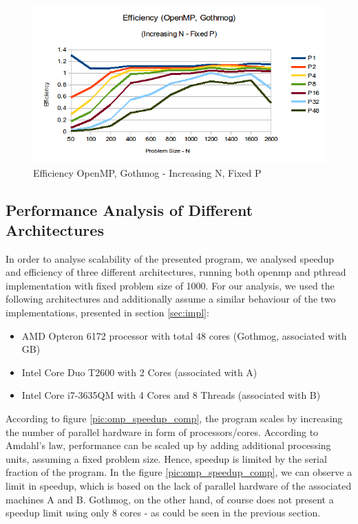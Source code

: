 \documentclass[conference]{IEEEtran}
\begin{document}
\begin{figure}[h]
  \centering
  \includegraphics[scale=0.42]{pic/omp_gothmog_efficiency-fixed-p.png} 
  \caption{Efficiency OpenMP, Gothmog - Increasing N, Fixed P}
  \label{pic:omp_eff_fixed-p}
\end{figure}

\subsection{Performance Analysis of Different Architectures}
\label{sec:analysis:openmp}

In order to analyse scalability of the presented program, we analysed speedup and efficiency of three different architectures, running both openmp and pthread implementation with fixed problem size of 1000. For our analysis, we used the following architectures and additionally assume a similar behaviour of the two implementations, presented in section \ref{sec:impl}:
\begin{itemize}
   \item AMD Opteron 6172 processor with total 48 cores (Gothmog, associated with GB)
   \item Intel Core Duo T2600 with 2 Cores (associated with A)
   \item Intel Core i7-3635QM with 4 Cores and 8 Threads (associated with B)
\end{itemize}

According to figure \ref{pic:omp_speedup_comp}, the program scales by increasing the number of parallel hardware in form of processors/cores. According to Amdahl's law, performance can be scaled up by adding additional processing units, assuming a fixed problem size. Hence, speedup is limited by the serial fraction of the program. In the figure \ref{pic:omp_speedup_comp}, we can observe a limit in speedup, which is based on the lack of parallel hardware of the associated machines A and B. Gothmog, on the other hand, of course does not present a speedup limit using only 8 cores - as could be seen in the previous section. 
\end{document}

